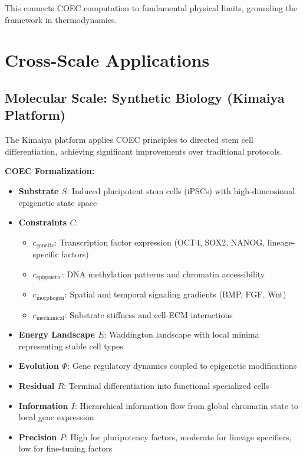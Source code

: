 \documentclass[11pt]{article}
\begin{document}
This connects COEC computation to fundamental physical limits, grounding the framework in thermodynamics.

\section{Cross-Scale Applications}
\label{sec:applications}

\subsection{Molecular Scale: Synthetic Biology (Kimaiya Platform)}

The Kimaiya platform applies COEC principles to directed stem cell differentiation, achieving significant improvements over traditional protocols.

\textbf{COEC Formalization:}
\begin{itemize}
\item \textbf{Substrate $S$}: Induced pluripotent stem cells (iPSCs) with high-dimensional epigenetic state space
\item \textbf{Constraints $C$}:
  \begin{itemize}
  \item $c_{\text{genetic}}$: Transcription factor expression (OCT4, SOX2, NANOG, lineage-specific factors)
  \item $c_{\text{epigenetic}}$: DNA methylation patterns and chromatin accessibility
  \item $c_{\text{morphogen}}$: Spatial and temporal signaling gradients (BMP, FGF, Wnt)
  \item $c_{\text{mechanical}}$: Substrate stiffness and cell-ECM interactions
  \end{itemize}
\item \textbf{Energy Landscape $E$}: Waddington landscape with local minima representing stable cell types \citep{waddington1957strategy}
\item \textbf{Evolution $\Phi$}: Gene regulatory dynamics coupled to epigenetic modifications
\item \textbf{Residual $R$}: Terminal differentiation into functional specialized cells
\item \textbf{Information $I$}: Hierarchical information flow from global chromatin state to local gene expression
\item \textbf{Precision $P$}: High for pluripotency factors, moderate for lineage specifiers, low for fine-tuning factors
\end{itemize}
\end{document}
